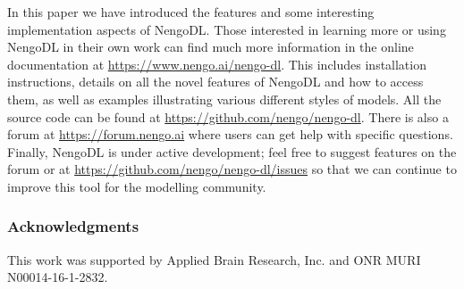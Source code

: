 \documentclass{article}
\begin{document}
In this paper we have introduced the features and some interesting implementation aspects of NengoDL.  Those interested in learning more or using NengoDL in their own work can find much more information in the online documentation at \url{https://www.nengo.ai/nengo-dl}.  This includes installation instructions, details on all the novel features of NengoDL and how to access them, as well as examples illustrating various different styles of models.  All the source code can be found at \url{https://github.com/nengo/nengo-dl}.  There is also a forum at \url{https://forum.nengo.ai} where users can get help with specific questions.  Finally, NengoDL is under active development; feel free to suggest features on the forum or at \url{https://github.com/nengo/nengo-dl/issues} so that we can continue to improve this tool for the modelling community.

\subsubsection*{Acknowledgments}

This work was supported by Applied Brain Research, Inc. and ONR MURI N00014-16-1-2832.

\small


\end{document}
